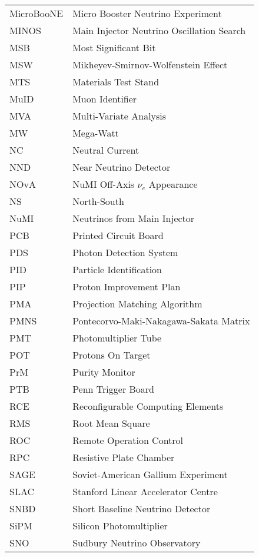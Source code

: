\begin{longtable}{l p{11cm}}
MicroBooNE  & Micro Booster Neutrino Experiment \\
MINOS       & Main Injector Neutrino Oscillation Search \\
MSB         & Most Significant Bit \\
MSW         & Mikheyev-Smirnov-Wolfenstein Effect \\
MTS         & Materials Test Stand \\
MuID        & Muon Identifier \\
MVA         & Multi-Variate Analysis \\
MW          & Mega-Watt \\
NC          & Neutral Current \\
NND         & Near Neutrino Detector \\
NOvA        & NuMI Off-Axis $\nu_e$ Appearance \\
NS          & North-South \\
NuMI        & Neutrinos from Main Injector \\
PCB         & Printed Circuit Board \\
PDS         & Photon Detection System \\
PID         & Particle Identification \\
PIP         & Proton Improvement Plan \\
PMA         & Projection Matching Algorithm \\
PMNS        & Pontecorvo-Maki-Nakagawa-Sakata Matrix \\
PMT         & Photomultiplier Tube \\
POT         & Protons On Target \\
PrM         & Purity Monitor \\
PTB         & Penn Trigger Board \\
RCE         & Reconfigurable Computing Elements \\
RMS         & Root Mean Square \\
ROC         & Remote Operation Control \\
RPC         & Resistive Plate Chamber \\
SAGE        & Soviet-American Gallium Experiment \\
SLAC        & Stanford Linear Accelerator Centre \\
SNBD        & Short Baseline Neutrino Detector \\
SiPM        & Silicon Photomultiplier \\
SNO         & Sudbury Neutrino Observatory \\

\end{longtable}
